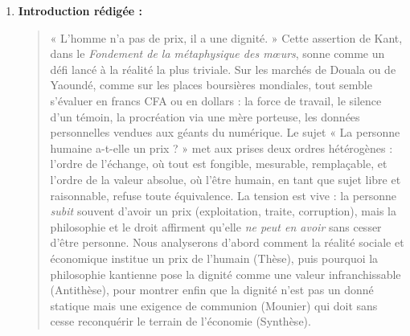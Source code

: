 \documentclass[11pt]{article}
\newcommand{\cle}[1]{{\popxbold\color{popdark}#1}}
\begin{document}
\begin{corrige}
\begin{enumerate}
    \item \textbf{Introduction rédigée :}
    \begin{quote}
    « L'homme n'a pas de prix, il a une dignité. » Cette assertion de Kant, dans le \emph{Fondement de la métaphysique des mœurs}, sonne comme un défi lancé à la réalité la plus triviale. Sur les marchés de Douala ou de Yaoundé, comme sur les places boursières mondiales, tout semble s'évaluer en francs CFA ou en dollars : la force de travail, le silence d'un témoin, la procréation via une mère porteuse, les données personnelles vendues aux géants du numérique. Le sujet « La personne humaine a-t-elle un prix ? » met aux prises deux ordres hétérogènes : l'ordre de l'\cle{échange}, où tout est fongible, mesurable, remplaçable, et l'ordre de la \cle{valeur absolue}, où l'être humain, en tant que sujet libre et raisonnable, refuse toute équivalence. La tension est vive : la personne \emph{subit} souvent d'avoir un prix (exploitation, traite, corruption), mais la philosophie et le droit affirment qu'elle \emph{ne peut en avoir} sans cesser d'être personne. Nous analyserons d'abord comment la réalité sociale et économique institue un prix de l'humain (Thèse), puis pourquoi la philosophie kantienne pose la dignité comme une valeur infranchissable (Antithèse), pour montrer enfin que la dignité n'est pas un donné statique mais une \cle{exigence de communion} (Mounier) qui doit sans cesse reconquérir le terrain de l'économie (Synthèse).
    \end{quote}
\end{enumerate}
\end{corrige}
\end{document}
